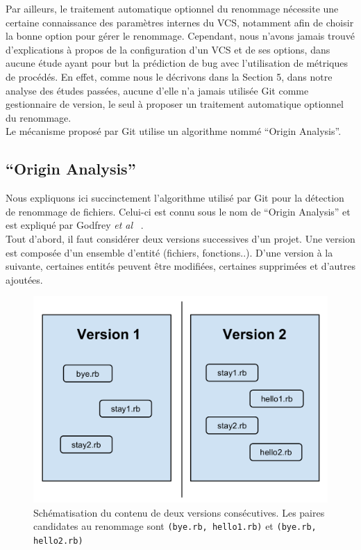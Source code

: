 Par ailleurs, le traitement automatique optionnel du renommage nécessite une certaine connaissance des paramètres internes du VCS, notamment afin de choisir la bonne option pour gérer le renommage. Cependant, nous n'avons jamais trouvé d'explications à propos de la configuration d'un VCS et de ses options, dans aucune étude ayant pour but la prédiction de bug avec l'utilisation de métriques de procédés. En effet, comme nous le décrivons dans la Section 5, dans notre analyse des études passées, aucune d'elle n'a jamais utilisée Git comme gestionnaire de version, le seul à proposer un traitement automatique optionnel du renommage.\\

Le mécanisme proposé par Git utilise un algorithme nommé ``Origin Analysis''.

\subsection{``Origin Analysis''}

Nous expliquons ici succinctement l'algorithme utilisé par Git pour la détection de renommage de fichiers. Celui-ci est connu sous le nom de ``Origin Analysis'' et est expliqué par Godfrey \emph{et al} ~\cite{tu_integrated_2002,godfrey_tracking_2002,godfrey_using_2005}.\\

Tout d'abord, il faut considérer deux versions successives d'un projet. Une version est composée d'un ensemble d'entité (fichiers, fonctions..). D'une version à la suivante, certaines entités peuvent être modifiées, certaines supprimées et d'autres ajoutées. 

\begin{figure}[h]
  \centering
  \includegraphics[scale=0.25]{data/figures/oa.png}
	\caption{Schématisation du contenu de deux versions consécutives. Les paires candidates au renommage sont \texttt{(bye.rb, hello1.rb)} et \texttt{(bye.rb, hello2.rb)}}
	\label{fig:oa}
\end{figure}

